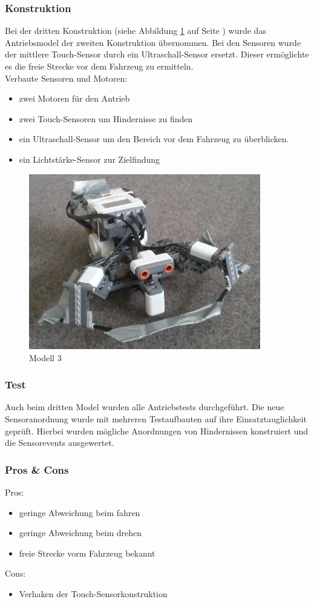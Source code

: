 \documentclass[10pt,a4paper]{scrartcl}
\begin{document}
\subsubsection{Konstruktion}
Bei der dritten Konstruktion (siehe Abbildung \ref{modell3} auf Seite \pageref{modell3}) wurde das Antriebsmodel der zweiten Konstruktion übernommen. Bei den Sensoren wurde der mittlere Touch-Sensor durch ein Ultraschall-Sensor ersetzt. Dieser ermöglichte es die freie Strecke vor dem Fahrzeug zu ermitteln.\\
Verbaute Sensoren und Motoren:
\begin{itemize}
\item zwei Motoren für den Antrieb
\item zwei Touch-Sensoren um Hindernisse zu finden
\item ein Ultraschall-Sensor um den Bereich vor dem Fahrzeug zu überblicken.
\item ein Lichtstärke-Sensor zur Zielfindung
\end{itemize}
\begin{figure}[ht]
	\centering
  \includegraphics[width=0.9\textwidth, angle=0]{modell3.jpg}
	\caption{Modell 3}
	\label{modell3}
\end{figure}
\subsubsection{Test}
Auch beim dritten Model wurden alle Antriebstests durchgeführt. Die neue Sensoranordnung wurde mit mehreren Testaufbauten auf ihre Einsatztauglichkeit geprüft. Hierbei wurden mögliche Anordnungen von Hindernissen konstruiert und die Sensorevents ausgewertet.
\subsubsection{Pros \& Cons}
Pros:
\begin{itemize}
\item geringe Abweichung beim fahren
\item geringe Abweichung beim drehen
\item freie Strecke vorm Fahrzeug bekannt
\end{itemize}
Cons:
\begin{itemize}
\item Verhaken der Touch-Sensorkonstruktion
\end{itemize}
\end{document}
